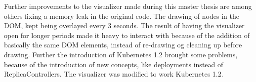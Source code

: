 \noindent Further improvements to the visualizer made during this master thesis are among others fixing a memory leak in the original code. The drawing of nodes in the DOM, kept being overlayed every 3 seconds. The result of having the visualizer open for longer periods made it heavy to interact with because of the addition of basically the same DOM elements, instead of re-drawing og cleaning up before drawing. Further the introduction of Kubernetes 1.2 brought some problems, because of the introduction of new concepts, like deployments instead of ReplicaControllers. The visualizer was modified to work Kubernetes 1.2.
